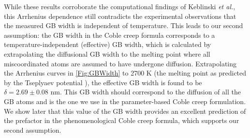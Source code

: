 \documentclass[preprint,12pt,sort&compress]{elsarticle} %
\newcommand{\?}{\stackrel{?}{=}}
\providecommand{\DIFaddtex}[1]{{\sf #1}} %
\providecommand{\DIFaddbegin}{\protect\color{blue}} %
\providecommand{\DIFaddend}{\protect\color{black}} %
\providecommand{\DIFadd}[1]{\texorpdfstring{\DIFaddtex{#1}}{#1}} %
\newcommand{\DIFaddincludegraphics}[2][]{{\color{blue}\fbox{\DIFOincludegraphics[#1]{#2}}}} %
\DeclareRobustCommand{\DIFaddbegin}{\DIFOaddbegin \let\includegraphics\DIFaddincludegraphics} %
\DeclareRobustCommand{\DIFaddend}{\DIFOaddend \let\includegraphics\DIFOincludegraphics} %
\begin{document}
While these results corroborate the computational findings of Keblinski \textit{et al.}, this Arrhenius dependence still contradicts the experimental observations that the measured GB width is independent of temperature. This leads to our second assumption: the GB width in the Coble creep formula corresponds to a temperature-independent (effective) GB width, which is calculated by extrapolating the diffusional GB width to the melting point where all miscoordinated atoms are assumed to have undergone diffusion. Extrapolating the Arrhenius curves in \cref{Fig:GBWidth} to 2700 K (the melting point as predicted by the Tseplyaev potential \cite{AbdulHameed2024}), the effective GB width is found to be $\delta = 2.69 \pm 0.08$ nm. This GB width should correspond to the diffusion of all the GB atoms and is the one we use in \DIFaddbegin \DIFadd{the }\DIFaddend parameter-based Coble creep formulation. We show later that this value of the GB width provides an excellent prediction of the prefactor in the phenomenological Coble creep formula, which supports our second assumption.
\end{document}
